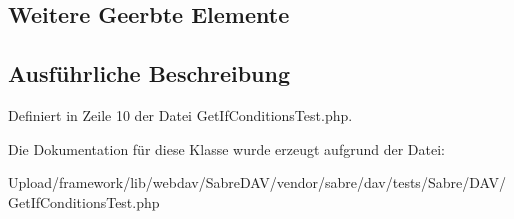 \subsection*{Weitere Geerbte Elemente}


\subsection{Ausführliche Beschreibung}


Definiert in Zeile 10 der Datei Get\+If\+Conditions\+Test.\+php.



Die Dokumentation für diese Klasse wurde erzeugt aufgrund der Datei\+:\begin{DoxyCompactItemize}
\item 
Upload/framework/lib/webdav/\+Sabre\+D\+A\+V/vendor/sabre/dav/tests/\+Sabre/\+D\+A\+V/Get\+If\+Conditions\+Test.\+php\end{DoxyCompactItemize}
